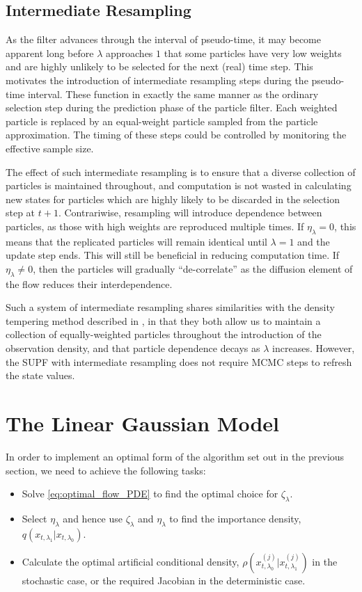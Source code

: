 \documentclass[a4paper,10pt]{article}
\newcommand{\rt}{t}                             %
\newcommand{\pt}{\lambda}                       %
\newcommand{\ls}[1]{x_{#1}}                     %
\newcommand{\pss}[2][]{^{(#2)#1}}               %
\newcommand{\impden}{q}                         %
\newcommand{\artden}{\rho}                      %
\newcommand{\flowdrift}[1]{\zeta_{#1}}          %
\newcommand{\flowdiffuse}[1]{\eta_{#1}}         %
\begin{document}
\subsection{Intermediate Resampling}

As the filter advances through the interval of pseudo-time, it may become apparent long before $\pt$ approaches $1$ that some particles have very low weights and are highly unlikely to be selected for the next (real) time step. This motivates the introduction of intermediate resampling steps during the pseudo-time interval. These function in exactly the same manner as the ordinary selection step during the prediction phase of the particle filter. Each weighted particle is replaced by an equal-weight particle sampled from the particle approximation. The timing of these steps could be controlled by monitoring the effective sample size.

The effect of such intermediate resampling is to ensure that a diverse collection of particles is maintained throughout, and computation is not wasted in calculating new states for particles which are highly likely to be discarded in the selection step at $\rt+1$. Contrariwise, resampling will introduce dependence between particles, as those with high weights are reproduced multiple times. If $\flowdiffuse{\pt}=0$, this means that the replicated particles will remain identical until $\pt=1$ and the update step ends. This will still be beneficial in reducing computation time. If $\flowdiffuse{\pt} \ne 0$, then the particles will gradually ``de-correlate'' as the diffusion element of the flow reduces their interdependence.

Such a system of intermediate resampling shares similarities with the density tempering method described in \cite{Godsill2001b}, in that they both allow us to maintain a collection of equally-weighted particles throughout the introduction of the observation density, and that particle dependence decays as $\pt$ increases. However, the SUPF with intermediate resampling does not require MCMC steps to refresh the state values.



\section{The Linear Gaussian Model}

In order to implement an optimal form of the algorithm set out in the previous section, we need to achieve the following tasks:
\begin{itemize}
  \item Solve \eqref{eq:optimal_flow_PDE} to find the optimal choice for $\flowdrift{\pt}$.
  \item Select $\flowdiffuse{\pt}$ and hence use $\flowdrift{\pt}$ and $\flowdiffuse{\pt}$ to find the importance density, $\impden(\ls{\rt,\pt_1} | \ls{\rt,\pt_0})$.
  \item Calculate the optimal artificial conditional density, $\artden(\ls{\rt,\pt_0}\pss{j} | \ls{\rt,\pt_1}\pss{j})$ in the stochastic case, or the required Jacobian in the deterministic case.
\end{itemize}
\end{document}
